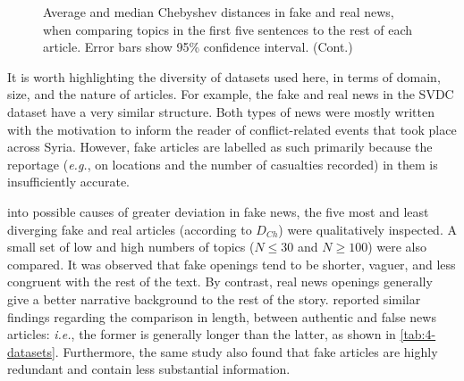 \begin{figure}[th]\ContinuedFloat
    \centering
    \begin{subfigure} %
        \label{fig:4-results-svdc}
    \end{subfigure}
    \caption{Average and median Chebyshev distances in fake and real news, when comparing topics in the first five sentences to the rest of each article. Error bars show 95\% confidence interval. (Cont.)}\label{fig:4-results}
\end{figure}
\FloatBarrier

It is worth highlighting the diversity of datasets used here, in terms of domain, size, and the nature of articles. For example, the fake and real news in the SVDC dataset have a very similar structure. Both types of news were mostly written with the motivation to inform the reader of conflict-related events that took place across Syria. However, fake articles are labelled as such primarily because the reportage (\emph{e.g.}, on locations and the number of casualties recorded) in them is insufficiently accurate.

 into possible causes of greater deviation in fake news, the five most and least diverging fake and real articles (according to $D_{Ch}$) were qualitatively inspected. A small set of low and high numbers of topics ($N \leq 30$ and $N \geq 100$) were also compared. It was observed that fake openings tend to be shorter, vaguer, and less congruent with the rest of the text. By contrast, real news openings generally give a better narrative background to the rest of the story.  reported similar findings regarding the comparison in length, between authentic and false news articles: \emph{i.e.}, the former is generally longer than the latter, as shown in \autoref{tab:4-datasets}. Furthermore, the same study also found that fake articles are highly redundant and contain less substantial information.

